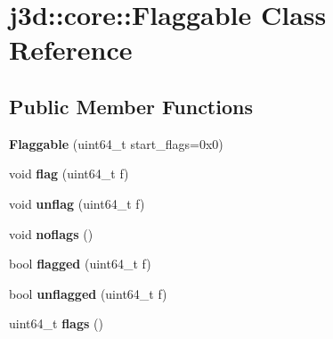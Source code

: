 \hypertarget{classj3d_1_1core_1_1Flaggable}{}\section{j3d\+:\+:core\+:\+:Flaggable Class Reference}
\label{classj3d_1_1core_1_1Flaggable}
\subsection*{Public Member Functions}
\begin{DoxyCompactItemize}
\item 
\hypertarget{classj3d_1_1core_1_1Flaggable_ae10da546e766dac4768bcd1d95309026}{}{\bfseries Flaggable} (uint64\+\_\+t start\+\_\+flags=0x0)\label{classj3d_1_1core_1_1Flaggable_ae10da546e766dac4768bcd1d95309026}

\item 
\hypertarget{classj3d_1_1core_1_1Flaggable_a003e21aa046dd59f4f572e57d52df84a}{}void {\bfseries flag} (uint64\+\_\+t f)\label{classj3d_1_1core_1_1Flaggable_a003e21aa046dd59f4f572e57d52df84a}

\item 
\hypertarget{classj3d_1_1core_1_1Flaggable_a45cfd6ad5aa5c9b1b2c1aaf916e4dbe8}{}void {\bfseries unflag} (uint64\+\_\+t f)\label{classj3d_1_1core_1_1Flaggable_a45cfd6ad5aa5c9b1b2c1aaf916e4dbe8}

\item 
\hypertarget{classj3d_1_1core_1_1Flaggable_a9d017d22ca4b29ea9fd5561e757916a5}{}void {\bfseries noflags} ()\label{classj3d_1_1core_1_1Flaggable_a9d017d22ca4b29ea9fd5561e757916a5}

\item 
\hypertarget{classj3d_1_1core_1_1Flaggable_aeadf0a69b8a228a8be7b860ba021ab8b}{}bool {\bfseries flagged} (uint64\+\_\+t f)\label{classj3d_1_1core_1_1Flaggable_aeadf0a69b8a228a8be7b860ba021ab8b}

\item 
\hypertarget{classj3d_1_1core_1_1Flaggable_a6272023846e3dcafc11299f6aadced96}{}bool {\bfseries unflagged} (uint64\+\_\+t f)\label{classj3d_1_1core_1_1Flaggable_a6272023846e3dcafc11299f6aadced96}

\item 
\hypertarget{classj3d_1_1core_1_1Flaggable_a2f69054e94b4e0d2c876dc68dc1a6ad4}{}uint64\+\_\+t {\bfseries flags} ()\label{classj3d_1_1core_1_1Flaggable_a2f69054e94b4e0d2c876dc68dc1a6ad4}

\end{DoxyCompactItemize}
